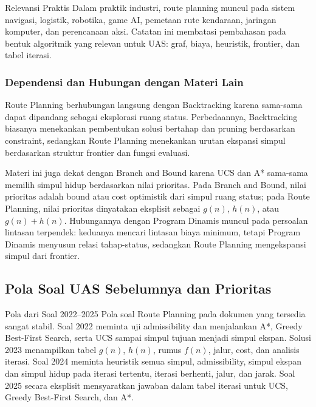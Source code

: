 \begin{cmt}{Relevansi Praktis}{}
Dalam praktik industri, route planning muncul pada sistem navigasi, logistik, robotika, game AI, pemetaan rute kendaraan, jaringan komputer, dan perencanaan aksi. Catatan ini membatasi pembahasan pada bentuk algoritmik yang relevan untuk UAS: graf, biaya, heuristik, frontier, dan tabel iterasi.
\end{cmt}

\subsubsection{Dependensi dan Hubungan dengan Materi Lain}

Route Planning berhubungan langsung dengan Backtracking karena sama-sama dapat dipandang sebagai eksplorasi ruang status. Perbedaannya, Backtracking biasanya menekankan pembentukan solusi bertahap dan pruning berdasarkan constraint, sedangkan Route Planning menekankan urutan ekspansi simpul berdasarkan struktur frontier dan fungsi evaluasi.

Materi ini juga dekat dengan Branch and Bound karena UCS dan A* sama-sama memilih simpul hidup berdasarkan nilai prioritas. Pada Branch and Bound, nilai prioritas adalah bound atau cost optimistik dari simpul ruang status; pada Route Planning, nilai prioritas dinyatakan eksplisit sebagai $g(n)$, $h(n)$, atau $g(n)+h(n)$. Hubungannya dengan Program Dinamis muncul pada persoalan lintasan terpendek: keduanya mencari lintasan biaya minimum, tetapi Program Dinamis menyusun relasi tahap-status, sedangkan Route Planning mengekspansi simpul dari frontier.

\subsection{Pola Soal UAS Sebelumnya dan Prioritas}

\begin{cmt}{Pola dari Soal 2022--2025}{}
Pola soal Route Planning pada dokumen yang tersedia sangat stabil. Soal 2022 meminta uji admissibility dan menjalankan A*, Greedy Best-First Search, serta UCS sampai simpul tujuan menjadi simpul ekspan. Solusi 2023 menampilkan tabel $g(n)$, $h(n)$, rumus $f(n)$, jalur, cost, dan analisis iterasi. Soal 2024 meminta heuristik semua simpul, admissibility, simpul ekspan dan simpul hidup pada iterasi tertentu, iterasi berhenti, jalur, dan jarak. Soal 2025 secara eksplisit mensyaratkan jawaban dalam tabel iterasi untuk UCS, Greedy Best-First Search, dan A*.
\end{cmt}

